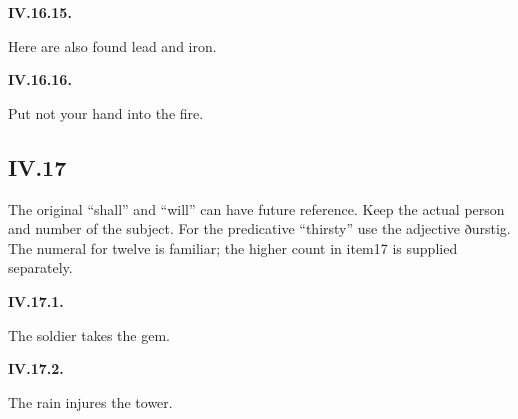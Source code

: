 \par\begin{minipage}{\linewidth}\raggedright
\textbf{IV.16.15.}

Here are also found lead and iron.

\end{minipage}\par\addvspace{4pt}

\par\begin{minipage}{\linewidth}\raggedright
\textbf{IV.16.16.}

Put not your hand into the fire.

\end{minipage}\par\addvspace{4pt}

\subsection*{IV.17}

The original “shall” and “will” can have future reference. Keep the actual person and number of the subject. For the predicative “thirsty” use the adjective ðurstig. The numeral for twelve is familiar; the higher count in item17 is supplied separately.

\par\begin{minipage}{\linewidth}\raggedright
\textbf{IV.17.1.}

The soldier takes the gem.

\end{minipage}\par\addvspace{4pt}

\par\begin{minipage}{\linewidth}\raggedright
\textbf{IV.17.2.}

The rain injures the tower.

\end{minipage}\par\addvspace{4pt}

